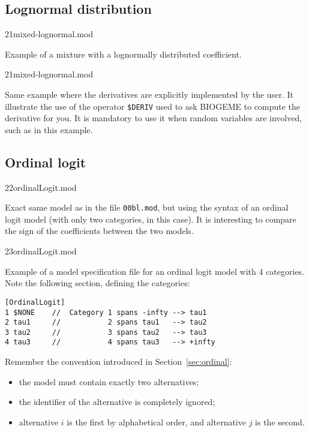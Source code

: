 \documentclass[12pt]{memoir}
\begin{document}
\subsection{Lognormal distribution}
\begin{flushright}
21mixed-lognormal.mod
\end{flushright}

Example of a mixture with a lognormally distributed coefficient.

\begin{flushright}
21mixed-lognormal.mod
\end{flushright}

Same example where the derivatives are explicitly implemented by the user. It illustrate the use of the operator \verb+$DERIV+ used to ask BIOGEME to compute the derivative for you. It is mandatory to use it when random variables are involved, such as in this example. 

\subsection{Ordinal logit}
\begin{flushright}
22ordinalLogit.mod
\end{flushright}

Exact same model as in the file \verb+00bl.mod+, but using the syntax of an ordinal logit model (with only two categories, in this case). It is interesting to compare the sign of the coefficients between the two models. 

\begin{flushright}
23ordinalLogit.mod
\end{flushright}


Example of a model specification file for an ordinal logit model with 4 categories. Note the following section, defining the categories:
\footnotesize
{\footnotesize
\begin{verbatim}
[OrdinalLogit]
1 $NONE    //  Category 1 spans -infty --> tau1 
2 tau1     //           2 spans tau1   --> tau2
3 tau2     //           3 spans tau2   --> tau3
4 tau3     //           4 spans tau3   --> +infty
\end{verbatim}
}
\normalsize

Remember the convention introduced in Section~\ref{sec:ordinal}:
\begin{itemize}
\item the model must contain exactly two alternatives;
\item the identifier of the alternative is completely ignored;
\item alternative $i$ is the first by alphabetical order, and alternative $j$ is the second.
\end{itemize}
\end{document}
